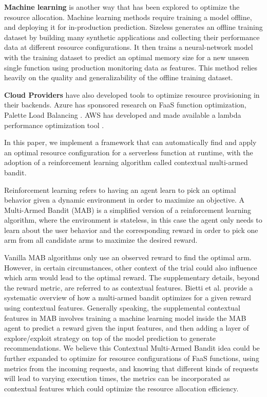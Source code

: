 \documentclass[conference]{IEEEtran}
\begin{document}
\textbf{Machine learning} is another way that has been explored to optimize the resource allocation. Machine learning methods require training a model offline, and deploying it for in-production prediction. Sizeless \cite{10.1145/3464298.3493398} generates an offline training dataset by building many synthetic applications and collecting their performance data at different resource configurations. It then trains a neural-network model with the training dataset to predict an optimal memory size for a new unseen single function using production monitoring data as features. This method relies heavily on the quality and generalizability of the offline training dataset.

\textbf{Cloud Providers} have also developed tools to optimize resource provisioning in their backends. Azure has sponsored research on FaaS function optimization, Palette Load Balancing \cite{10.1145/3552326.3567496}. AWS has developed and made available a lambda performance optimization tool \cite{aws_operating_lambda_performance_optimization}.

In this paper, we implement a framework that can automatically find and apply an optimal resource configuration for a serverless function at runtime, with the adoption of a reinforcement learning algorithm called contextual multi-armed bandit.

Reinforcement learning refers to having an agent learn to pick an optimal behavior given a dynamic environment in order to maximize an objective. A Multi-Armed Bandit (MAB) is a simplified version of a reinforcement learning algorithm, where the environment is stateless, in this case the agent only needs to learn about the user behavior and the corresponding reward in order to pick one arm from all candidate arms to maximize the desired reward.

Vanilla MAB algorithms only use an observed reward to find the optimal arm. However, in certain circumstances, other context of the trial could also influence which arm would lead to the optimal reward. The supplementary details, beyond the reward metric, are referred to as contextual features. Bietti et al. \cite{10.5555/3546258.3546391} provide a systematic overview of how a multi-armed bandit optimizes for a given reward using contextual features. Generally speaking, the supplemental contextual features in MAB involves training a machine learning model inside the MAB agent to predict a reward given the input features, and then adding a layer of explore/exploit strategy on top of the model prediction to generate recommendations. We believe this Contextual Multi-Armed Bandit idea could be further expanded to optimize for resource configurations of FaaS functions, using metrics from the incoming requests, and knowing that different kinds of requests will lead to varying execution times, the metrics can be incorporated as contextual features which could optimize the resource allocation efficiency.
\end{document}
